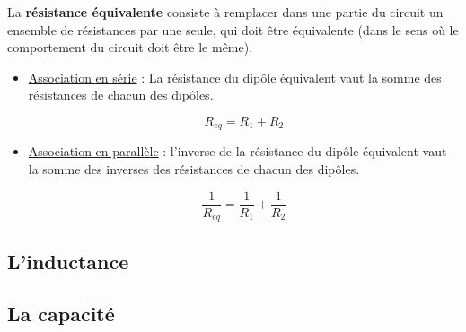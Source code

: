 La \textbf{résistance équivalente} consiste à remplacer dans une partie du circuit un ensemble de résistances par une seule, qui doit être équivalente (dans le sens où le comportement du circuit doit être le même).\\ 

\begin{itemize}
\item \underline{Association en série} : La résistance du dipôle équivalent vaut la somme des résistances de chacun des dipôles. \\

\begin{center}
\begin{minipage}{.2\textwidth}
\begin{center}

\end{center}
\end{minipage}
\hspace{1cm}
\begin{minipage}{.3\textwidth} 
\begin{equation}
	R_{eq} = R_1 + R_2
\end{equation}
\end{minipage}
\end{center}

\vspace{0.5cm}

\item \underline{Association en parallèle} : l'inverse de la résistance du dipôle équivalent vaut la somme des inverses des résistances de chacun des dipôles. \\

\begin{center}
\begin{minipage}{.2\textwidth}
\begin{center}
	
\end{center}
\end{minipage}
\hspace{1cm}
\begin{minipage}{.3\textwidth} 
\begin{equation}
	\dfrac{1}{R_{eq}} = \dfrac{1}{R_1} + \dfrac{1}{R_2} 
\end{equation}
\end{minipage}
\end{center}
\end{itemize}

\subsection{ L'inductance }

\subsection{ La capacité }
